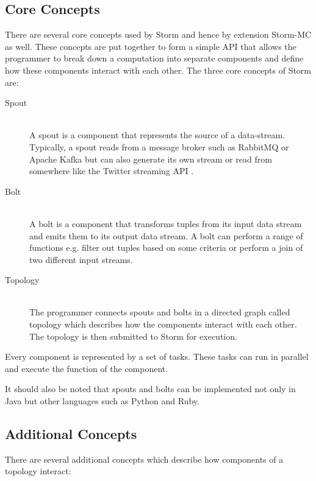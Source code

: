 \documentclass[bsc,deptreport,twoside,singlespacing,normalheadings,parskip]{infthesis}\usepackage[]{graphicx}\usepackage[]{color}
\begin{document}
\subsection{Core Concepts}

There are several core concepts used by Storm and hence by extension Storm-MC as well. These concepts are put together to form a simple API that allows the programmer to break down a computation into separate components and define how these components interact with each other. The three core concepts of Storm are:

\begin{description}
  \item[Spout] \hfill \\
  A spout is a component that represents the source of a data-stream. Typically, a spout reads from a message broker such as RabbitMQ \cite{RabbitMQ} or Apache Kafka but can also generate its own stream or read from somewhere like the Twitter streaming API \citep{TwitterStreaming}.
  \item[Bolt] \hfill \\
  A bolt is a component that transforms tuples from its input data stream and emits them to its output data stream. A bolt can perform a range of functions e.g. filter out tuples based on some criteria or perform a join of two different input streams.
  \item[Topology] \hfill \\
  The programmer connects spouts and bolts in a directed graph called topology which describes how the components interact with each other. The topology is then submitted to Storm for execution.
\end{description}

Every component is represented by a set of tasks. These tasks can run in parallel and execute the function of the component.

It should also be noted that spouts and bolts can be implemented not only in Java but other languages such as Python and Ruby.

\subsection{Additional Concepts}

There are several additional concepts which describe how components of a topology interact:
\end{document}
